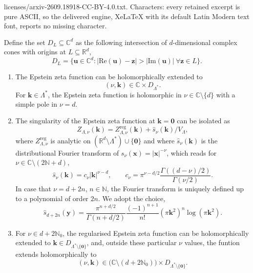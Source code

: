 \documentclass[10pt,a4paper]{amsart}
\renewcommand{\Im}[1]{\mathrm{Im}(#1)}
\renewcommand{\Re}[1]{\mathrm{Re}(#1)}
\begin{document}
licenses/arxiv-2609.18918-CC-BY-4.0.txt. Characters: every retained excerpt is pure ASCII, so the delivered engine, XeLaTeX with its default Latin Modern text font, reports no missing character.
\begin{lemma}
    \label{lem:holomorphy}
    Define the set $D_L\subseteq \mathds C^d$ as the  following intersection of $d$-dimensional complex cones with origins at $L\subseteq \mathds R^d$,
$$
D_L=\{\bm u\in\mathds C^d:|\Re{\bm u}-\bm z|>|\Im{\bm u}|\ \forall \bm z\in L\}.
$$
\begin{enumerate} \item The Epstein zeta function can be holomorphically extended to  
$$
(\nu,\bm k)\in 
\mathds C\times D_{\Lambda^*}.
$$
For $\bm k\in\Lambda^*$, the Epstein zeta function is holomorphic in $\nu\in\mathds C\setminus\{d\}$ with a simple pole in $\nu=d$.  

\item The singularity of the Epstein zeta function at $\bm k=\bm 0$ can be isolated as
    \[
    Z_{\Lambda,\nu}(\bm k) = Z_{\Lambda,\nu}^{\mathrm{reg}}(\bm k)+\hat s_\nu(\bm k)/V_\Lambda,
    \]
    where $Z_{\Lambda,\nu}^{\mathrm{reg}}$ is analytic on $(\mathds R^d\setminus \Lambda^\ast)\cup \{\bm 0\}$ and where $\hat s_\nu(\bm k)$ is the distributional Fourier transform of $s_\nu(\bm x)=\vert \bm x\vert^{-\nu}$, which reads for $\nu\in \mathds C\setminus (2\mathds N +d)$,
    \[
    \hat s_\nu(\bm k) = c_\nu \vert \bm k\vert^{\nu-d},\qquad c_\nu=\pi^{\nu-d/2}\frac{ \Gamma ((d-\nu)/2)}{\Gamma(\nu/2) }.
    \]
    In case that $\nu=d+2n$, $n\in \mathds N$, the Fourier transform is uniquely defined up to a polynomial of order $2n$. We adopt the choice,
\[\hat s_{d+2n}(\bm y)= \frac{\pi^{n+d/2}}{\Gamma(n+d/2)}\frac{(-1)^{n+1}}{n!} ( \pi \bm k^2 )^{n} \log (\pi  \bm k^{2}).
    \]
\item For $\nu\in d+2 \mathds N_0$, the regularised Epstein zeta function can be holomorphically extended to  $\bm k \in D_{\Lambda^\ast\setminus\{\bm 0\}}$,
and, outside these particular $\nu$ values, the funtion extends holomorphically to
\[
(\nu,\bm k) \in \big(\mathds C\setminus (d+2\mathds N_0)\big)\times D_{\Lambda^\ast\setminus\{\bm 0\}}.
\]
\end{enumerate}
\end{lemma}  
\end{document}

